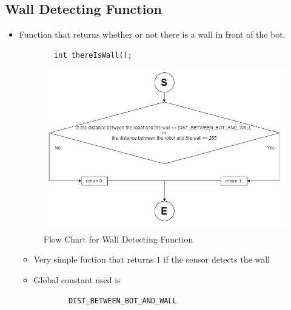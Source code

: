 \documentclass[11pt]{article}
\begin{document}

\subsection{Wall Detecting Function}
\begin{itemize}
\item Function that returns whether or not there is a wall in front of the bot.
	\begin{verbatim}
		int thereIsWall();
	\end{verbatim}
\begin{figure}[htp]
\centering
\includegraphics[scale=0.60]{images/Software_Flowchart/Detecting_Wall.png}
\caption{Flow Chart for Wall Detecting Function}
\label{}
\end{figure}
	\begin{itemize}
	\item Very simple fuction that returns $1$ if the sensor detects the wall
	\item Global constant used is
	\begin{verbatim}
		DIST_BETWEEN_BOT_AND_WALL
	\end{verbatim}
	\end{itemize}
\end{itemize}
\newpage

\end{document}
